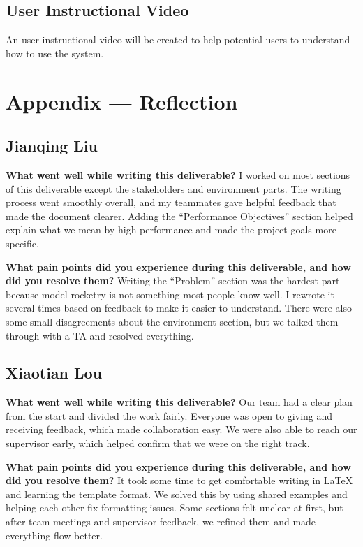 \documentclass{article}
\begin{document}
\subsection{User Instructional Video}

An user instructional video will be created to help potential users to
understand how to use the system.

\newpage{}

\section*{Appendix --- Reflection}

\subsection*{Jianqing Liu}

\textbf{What went well while writing this deliverable?}  
I worked on most sections of this deliverable except the stakeholders and
environment parts. The writing process went smoothly overall, and my teammates
gave helpful feedback that made the document clearer. Adding the “Performance
Objectives” section helped explain what we mean by high performance and made
the project goals more specific.

\textbf{What pain points did you experience during this deliverable, and how did you resolve them?}  
Writing the “Problem” section was the hardest part because model rocketry is
not something most people know well. I rewrote it several times based on
feedback to make it easier to understand. There were also some small
disagreements about the environment section, but we talked them through with a
TA and resolved everything.


\subsection*{Xiaotian Lou}

\textbf{What went well while writing this deliverable?}  
Our team had a clear plan from the start and divided the work fairly. Everyone
was open to giving and receiving feedback, which made collaboration easy. We
were also able to reach our supervisor early, which helped confirm that we were
on the right track.

\textbf{What pain points did you experience during this deliverable, and how did you resolve them?}  
It took some time to get comfortable writing in \LaTeX{} and learning the
template format. We solved this by using shared examples and helping each other
fix formatting issues. Some sections felt unclear at first, but after team
meetings and supervisor feedback, we refined them and made everything flow
better.
\end{document}
